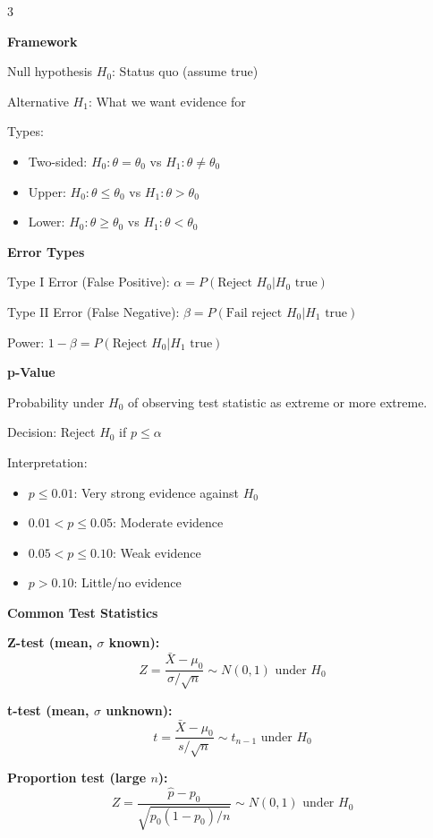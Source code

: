 \documentclass[10pt,letterpaper]{article}
\begin{document}
\begin{multicols}{3}
\vspace{2mm}
\vspace{0.5mm}

\textbf{Framework}

Null hypothesis $H_0$: Status quo (assume true)

Alternative $H_1$: What we want evidence for

Types:
\begin{itemize}
\item Two-sided: $H_0: \theta = \theta_0$ vs $H_1: \theta \neq \theta_0$
\item Upper: $H_0: \theta \le \theta_0$ vs $H_1: \theta > \theta_0$
\item Lower: $H_0: \theta \ge \theta_0$ vs $H_1: \theta < \theta_0$
\end{itemize}

\textbf{Error Types}

Type I Error (False Positive): $\alpha = P(\text{Reject } H_0 | H_0 \text{ true})$

Type II Error (False Negative): $\beta = P(\text{Fail reject } H_0 | H_1 \text{ true})$

Power: $1 - \beta = P(\text{Reject } H_0 | H_1 \text{ true})$

\textbf{p-Value}

Probability under $H_0$ of observing test statistic as extreme or more extreme.

Decision: Reject $H_0$ if $p \le \alpha$

Interpretation:
\begin{itemize}
\item $p \le 0.01$: Very strong evidence against $H_0$
\item $0.01 < p \le 0.05$: Moderate evidence
\item $0.05 < p \le 0.10$: Weak evidence
\item $p > 0.10$: Little/no evidence
\end{itemize}

\textbf{Common Test Statistics}

\textbf{Z-test (mean, $\sigma$ known):}
$$Z = \frac{\bar{X} - \mu_0}{\sigma/\sqrt{n}} \sim N(0,1) \text{ under } H_0$$

\textbf{t-test (mean, $\sigma$ unknown):}
$$t = \frac{\bar{X} - \mu_0}{s/\sqrt{n}} \sim t_{n-1} \text{ under } H_0$$

\textbf{Proportion test (large $n$):}
$$Z = \frac{\hat{p} - p_0}{\sqrt{p_0(1-p_0)/n}} \sim N(0,1) \text{ under } H_0$$


\end{multicols}
\end{document}
